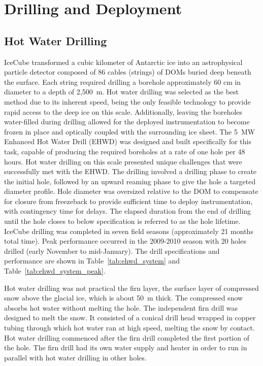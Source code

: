 
\section{Drilling and Deployment}

\subsection{\label{sec:hot_water_drilling}Hot Water Drilling}

IceCube transformed a cubic kilometer of Antarctic ice into an astrophysical particle detector composed of 86 cables (strings) of DOMs buried deep beneath the surface.  Each string required drilling a borehole approximately 60 cm in diameter to a depth of 2,500~m. Hot water drilling was selected as the best method due to its inherent speed, being the only feasible technology to provide rapid access to the deep ice on this scale.  Additionally, leaving the boreholes water-filled during drilling allowed for the deployed instrumentation to become frozen in place and optically coupled with the surrounding ice sheet. The 5~MW Enhanced Hot Water Drill (EHWD) was designed and built specifically for this task, capable of producing the required boreholes at a rate of one hole per 48 hours. Hot water drilling on this scale presented unique challenges that were successfully met with the EHWD. The drilling involved a drilling phase to create the initial hole, followed by an upward reaming phase to give the hole a targeted diameter profile.  Hole diameter was oversized relative to the DOM to compensate for closure from freezeback to provide sufficient time to deploy instrumentation, with contingency time for delays.  The elapsed duration from the end of drilling until the hole closes to below specification is referred to as the hole lifetime. IceCube drilling was completed in seven field seasons (approximately 21 months total time).  Peak performance occurred in the 2009-2010 season with 20 holes drilled (early November to mid-January).  The drill specifications and performance are shown in Table~\ref{tab:ehwd_system} and Table~\ref{tab:ehwd_system_peak}.

Hot water drilling was not practical the firn layer, the surface layer of compressed snow above the glacial ice, which is about 50~m thick. The compressed snow absorbs hot water without melting the hole. The independent firn drill was designed to melt the snow. It consisted of a conical drill head wrapped in copper tubing through which hot water ran at high speed, melting the snow by contact. Hot water drilling commenced after the firn drill completed the first portion of the hole. The firn drill had its own water supply and heater in order to run in parallel with hot water drilling in other holes.

